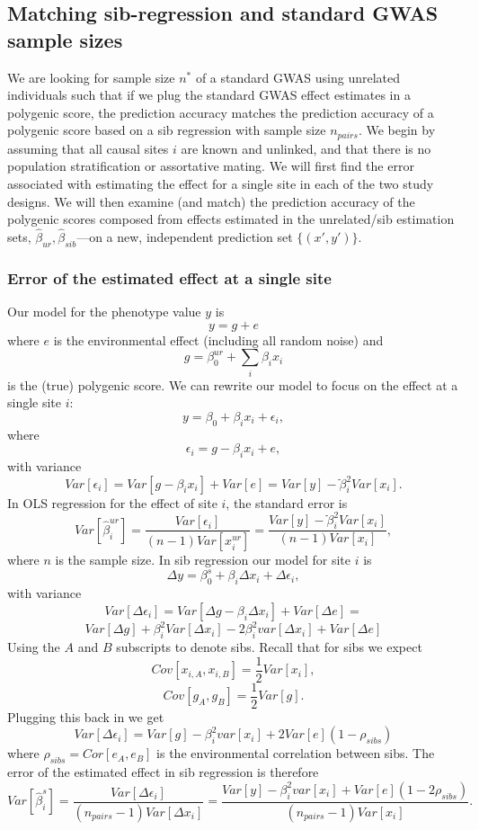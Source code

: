 \documentclass[hidelinks, 12pt]{article}
\begin{document}
\subsection{Matching sib-regression and standard GWAS sample sizes}
We are looking for sample size $n^*$ of a standard GWAS using unrelated individuals such that if we plug the standard GWAS effect estimates in a polygenic score, the prediction accuracy matches the prediction accuracy of a polygenic score based on a sib regression with sample size $n_{pairs}$.  We begin by assuming that all causal sites $i$ are known and unlinked, and that there is no population stratification or assortative mating.  We will first find the error associated with estimating the effect for a single site in each of the two study designs.  We will then examine (and match) the prediction accuracy of the polygenic scores composed from effects estimated in the unrelated/sib estimation sets, $\hat{\beta}_{ur},\hat{\beta}_{sib}$---on a new, independent prediction set $\{(x',y')\}$.

\subsubsection{Error of the estimated effect at a single site}
Our model for the phenotype value $y$ is
$$y=g+e$$
where $e$ is the environmental effect (including all random noise) and
$$g=\beta^{ur}_0+\sum_{i}\beta_ix_i$$ 
is the (true) polygenic score.  We can rewrite our model to focus on the effect at a single site $i$:
\begin{equation}
\label{ols_model}
y=\beta_0+\beta_ix_i+\epsilon_i,
\end{equation}
where 
$$\epsilon_i=g-\beta_i x_i+e,$$
with variance
$$Var[\epsilon_i]=Var[g-\beta_i x_i]+Var[e] = Var[y]-ֿ\beta_i^2Var[x_i].$$
In OLS regression for the effect of site $i$, the standard error is
$$Var[\hat{\beta}^{ur}_i]=\frac{Var[\epsilon_i]}{(n-1) Var[x_i^{ur}]} = \frac{Var[y]-ֿ\beta_i^2Var[x_i]}{(n-1)Var[x_i]},$$
where $n$ is the sample size.  In sib regression our model for site $i$ is
$$\Delta y=\beta^{s}_0+\beta_i \Delta x_i+\Delta \epsilon_i,$$
with variance
$$Var[\Delta \epsilon_i] = Var[\Delta g-\beta_i \Delta x_i] + Var[\Delta e] =$$
$$Var[\Delta g]+\beta_i^2Var[\Delta x_i]-2\beta_i^2var[\Delta x_i]+ Var[\Delta e]$$
Using the $A$ and $B$ subscripts to denote sibs. Recall that for sibs we expect
$$Cov[x_{i,A},x_{i,B}]=\frac{1}{2}Var[x_i],$$
$$Cov[g_A,g_B]=\frac{1}{2}Var[g].$$
Plugging this back in we get
$$Var[\Delta \epsilon_i] = Var[g] - \beta_i^2var[x_i] + 2Var[e](1-\rho_{sibs}) $$
where $\rho_{sibs} = Cor[e_A,e_B]$ is the environmental correlation between sibs. The error of the estimated effect in sib regression is therefore
$$Var[\hat{\beta}^{s}_i]=\frac{Var[\Delta \epsilon_i]}{(n_{pairs}-1) Var[\Delta x_i]} = \frac{Var[y] - \beta_i^2var[x_i] + Var[e](1-2\rho_{sibs})}{(n_{pairs}-1) Var[x_i]}.$$
\end{document}
